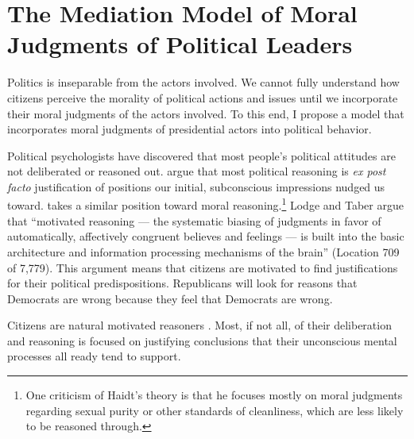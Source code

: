 %
%
%

\chapter{The Mediation Model of Moral Judgments of Political Leaders}\label{ch:theory}

Politics is inseparable from the actors involved. We cannot fully understand how citizens perceive the morality of political actions and issues until we incorporate their moral judgments of the actors involved. To this end, I propose a model that incorporates moral judgments of presidential actors into political behavior.

Political psychologists have discovered that most people's political attitudes are not deliberated or reasoned out.  argue that most political reasoning is \emph{ex post facto} justification of positions our initial, subconscious impressions nudged us toward.  takes a similar position toward moral reasoning.\footnote{One criticism of Haidt's theory is that he focuses mostly on moral judgments regarding sexual purity or other standards of cleanliness, which are less likely to be reasoned through.} Lodge and Taber argue that ``motivated reasoning --- the systematic biasing of judgments in favor of automatically, affectively congruent believes and feelings --- is built into the basic architecture and information processing mechanisms of the brain'' (Location 709 of 7,779). This argument means that citizens are motivated to find justifications for their political predispositions. Republicans will look for reasons that Democrats are wrong because they feel that Democrats are wrong.

Citizens are natural motivated reasoners \cite{LodgeTaber2013}. Most, if not all, of their deliberation and reasoning is focused on justifying conclusions that their unconscious mental processes all ready tend to support.

